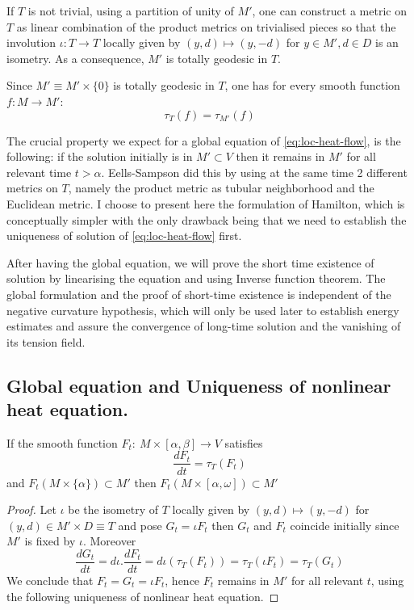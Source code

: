 If \(T\) is not trivial, using a partition of unity of \(M'\), one can construct a metric on \(T\)
as linear combination of the product metrics on trivialised pieces so that
the involution \(\iota: T \longrightarrow T\) locally given by \((y,d)\mapsto (y,-d)\)
for \(y\in M', d\in D\) is an isometry. As a consequence, \(M'\) is totally geodesic
in \(T\).


Since \(M' \equiv M'\times \{0\}\) is totally geodesic in \(T\), one has for every smooth
function \(f: M \longrightarrow M'\):
\[
 \tau_T(f) = \tau_{M'} (f)
\]

The crucial property we expect for a global equation of \eqref{eq:loc-heat-flow}, is the following: if
the solution initially is in \(M'\subset V\) then it remains in \(M'\) for all
relevant time \(t>\alpha\). Eells-Sampson \cite{eells_harmonic_1964} did this by using at
the same time 2 different metrics on \(T\), namely the product metric as tubular
neighborhood and the Euclidean metric. I choose to present here the formulation of
Hamilton, which is conceptually simpler with the only drawback being that we need to
establish the uniqueness of solution of \eqref{eq:loc-heat-flow} first.

After having the global equation, we will prove the short time existence of solution by
linearising the equation and using Inverse function theorem. The global formulation and the
proof of short-time existence is independent of the negative curvature hypothesis, which
will only be used later to establish energy estimates and assure the convergence of
long-time solution and the vanishing of its tension field.


\subsection{Global equation and Uniqueness of nonlinear heat equation.}
\label{sec:orgb597761}
\begin{theorem}
\label{thm:global-eq}
If the smooth function \(F_t:\ M\times [\alpha,\beta] \longrightarrow V\) satisfies
\begin{equation}
\label{eq:global-heat}
\frac{d F_t}{dt} = \tau_T(F_t)
\end{equation}
and \(F_t(M\times \{\alpha\}) \subset M'\) then \(F_t(M\times[\alpha,\omega])\subset M'\)
\end{theorem}
\begin{proof}
Let \(\iota\) be the isometry of \(T\) locally given by \((y,d)\mapsto (y,-d)\) for \((y,d)\in M'\times D \equiv T\) 
and pose \(G_t= \iota F_t\) then \(G_t\) and \(F_t\) coincide initially since \(M'\) is
fixed by \(\iota\). Moreover
\[
\frac{d G_t}{d t} = d\iota . \frac{d F_t}{d t} = d\iota (\tau_T(F_t)) = \tau_T(\iota F_t)=\tau_T(G_t)
\]
We conclude that \(F_t = G_t = \iota F_t\), hence \(F_t\) remains in \(M'\) for all
relevant \(t\), using the following uniqueness of nonlinear heat equation.
\end{proof}

